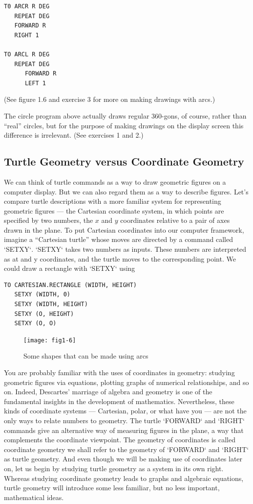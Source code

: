 \documentclass{book}
\begin{document}
\begin{verbatim}
T0 ARCR R DEG
   REPEAT DEG
   FORWARD R
   RIGHT 1

TO ARCL R DEG
   REPEAT DEG
      FORWARD R
      LEFT 1
\end{verbatim}
(See figure 1.6 and exercise 3 for more on making drawings with arcs.)

The circle program above actually draws regular 360-gons, of course,
rather than ``real'' circles, but for the purpose of making drawings on
the display screen this difference is irrelevant. (See exercises 1 and 2.)

\subsection{Turtle Geometry versus Coordinate Geometry}

We can think of turtle commands as a way to draw geometric figures on
a computer display. But we can also regard them as a way to describe
figures. Let's compare turtle descriptions with a more familiar system
for representing geometric figures --- the Cartesian coordinate system, in
which points are specified by two numbers, the $x$ and $y$ coordinates relative to a pair of axes drawn in the plane. To put Cartesian coordinates
into our computer framework, imagine a ``Cartesian turtle'' whose moves
are directed by a command called \textsc{`SETXY`}. \textsc{`SETXY`} takes two numbers as
inputs. These numbers are interpreted as at and y coordinates, and the
turtle moves to the corresponding point. We could draw a rectangle with
\textsc{`SETXY`} using

\begin{verbatim}
TO CARTESIAN.RECTANGLE (WIDTH, HEIGHT)
   SETXY (WIDTH, 0)
   SETXY (WIDTH, HEIGHT)
   SETXY (O, HEIGHT)
   SETXY (O, O)
\end{verbatim}

\begin{figure}
\begin{center}
\texttt{[image: fig1-6]}
\caption{Some shapes that can be made using arcs}
\end{center}
\end{figure}

You are probably familiar with the uses of coordinates in geometry:
studying geometric figures via equations, plotting graphs of numerical
relationships, and so on. Indeed, Descartes' marriage of algebra and
geometry is one of the fundamental insights in the development of mathematics. Nevertheless, these kinds of coordinate systems --- Cartesian,
polar, or what have you --- are not the only ways to relate numbers to
geometry. The turtle \textsc{`FORWARD`} and \textsc{`RIGHT`} commands give an alternative way of measuring figures in the plane, a way that complements the
coordinate viewpoint. The geometry of coordinates is called coordinate
geometry we shall refer to the geometry of \textsc{`FORWARD`} and \textsc{`RIGHT`} as turtle
geometry. And even though we will be making use of coordinates later
on, let us begin by studying turtle geometry as a system in its own right.
Whereas studying coordinate geometry leads to graphs and algebraic
equations, turtle geometry will introduce some less familiar, but no less
important, mathematical ideas.
\end{document}
